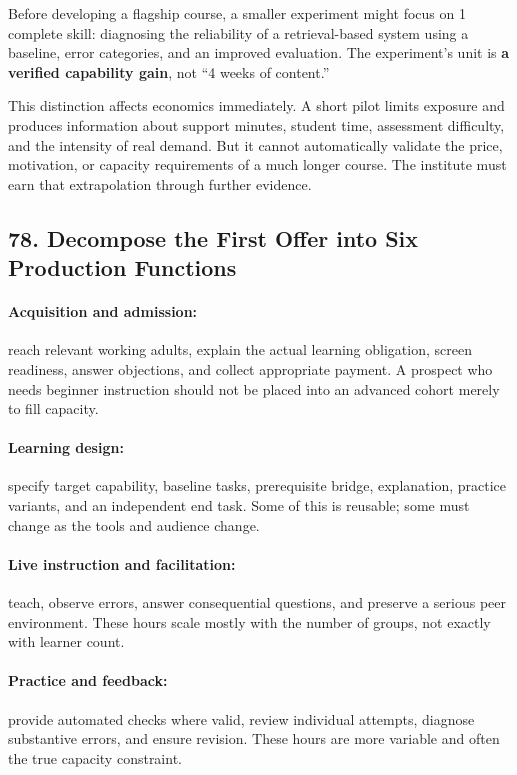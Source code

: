 Before developing a flagship course, a smaller experiment might focus on 1 complete skill: diagnosing the reliability of a retrieval-based system using a baseline, error categories, and an improved evaluation. The experiment's unit is \textbf{a verified capability gain}, not ``4 weeks of content.''

This distinction affects economics immediately. A short pilot limits exposure and produces information about support minutes, student time, assessment difficulty, and the intensity of real demand. But it cannot automatically validate the price, motivation, or capacity requirements of a much longer course. The institute must earn that extrapolation through further evidence.

\subsection*{78. Decompose the First Offer into Six Production Functions}

\paragraph*{Acquisition and admission:} reach relevant working adults, explain the actual learning obligation, screen readiness, answer objections, and collect appropriate payment. A prospect who needs beginner instruction should not be placed into an advanced cohort merely to fill capacity.

\paragraph*{Learning design:} specify target capability, baseline tasks, prerequisite bridge, explanation, practice variants, and an independent end task. Some of this is reusable; some must change as the tools and audience change.

\paragraph*{Live instruction and facilitation:} teach, observe errors, answer consequential questions, and preserve a serious peer environment. These hours scale mostly with the number of groups, not exactly with learner count.

\paragraph*{Practice and feedback:} provide automated checks where valid, review individual attempts, diagnose substantive errors, and ensure revision. These hours are more variable and often the true capacity constraint.

